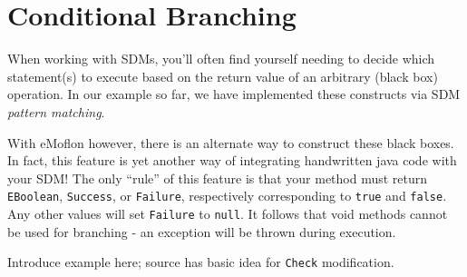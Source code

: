 \newpage
\hypertarget{sec:conBran}{}
\section{Conditional Branching}


When working with SDMs, you'll often find yourself needing to decide which statement(s) to execute based on the return value of an arbitrary (black box)
operation. In our example so far, we have implemented these constructs via SDM \emph{pattern matching}. 

With eMoflon however, there is an alternate way to
construct these black boxes. In fact, this feature is yet another way of integrating handwritten java code with your SDM! The only ``rule'' of this feature is that your
method must return \texttt{EBoolean}, \texttt{Success}, or \texttt{Failure}, respectively corresponding to \texttt{true} and \texttt{false}. Any other values
will set \texttt{Failure} to \texttt{null}. It follows that void methods cannot be used for branching - an exception will be thrown during execution.

Introduce example here; source has basic idea for \texttt{Check} modification.

% 
% 







